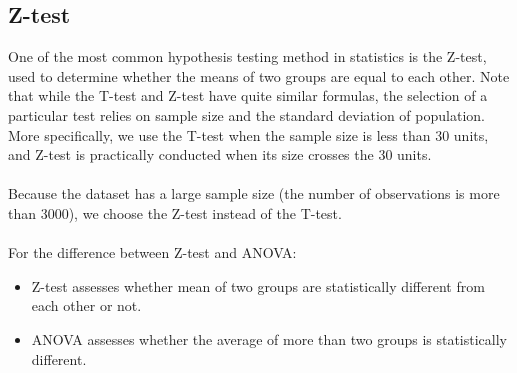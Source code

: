 \documentclass[a4paper]{article}
\begin{document}
\subsection{Z-test}
One of the most common hypothesis testing method in statistics is the Z-test, used to determine whether the means of two groups are equal to each other. Note that while the T-test and Z-test have quite similar formulas, the selection of a particular test relies on sample size and the standard deviation of population. More specifically, we use the T-test when the sample size is less than 30 units, and Z-test is practically conducted when its size crosses the 30 units.\\\\
Because the dataset has a large sample size (the number of observations is more than 3000), we choose the Z-test instead of the T-test.\\\\
For the difference between Z-test and ANOVA:
\begin{itemize}
    \item Z-test assesses whether mean of two groups are statistically different from each other or not.
    \item ANOVA assesses whether the average of more than two groups is statistically different.
\end{itemize}
\end{document}

